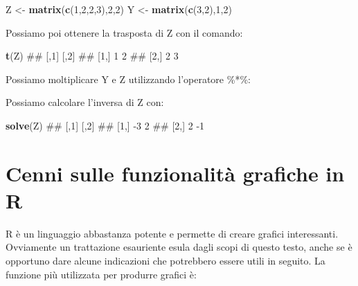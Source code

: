 \documentclass[a4paper,12pt,oneside]{book}
\newenvironment{Shaded}{\begin{snugshade}}{\end{snugshade}}
\newcommand{\KeywordTok}[1]{\textcolor[rgb]{0.13,0.29,0.53}{\textbf{#1}}}
\newcommand{\DecValTok}[1]{\textcolor[rgb]{0.00,0.00,0.81}{#1}}
\newcommand{\StringTok}[1]{\textcolor[rgb]{0.31,0.60,0.02}{#1}}
\newcommand{\OperatorTok}[1]{\textcolor[rgb]{0.81,0.36,0.00}{\textbf{#1}}}
\newcommand{\NormalTok}[1]{#1}
\theoremstyle{definition}
\theoremstyle{definition}
\theoremstyle{definition}
\theoremstyle{remark}
\begin{document}
\begin{Shaded}
\begin{Highlighting}[]
\NormalTok{Z  <-}\StringTok{  }\KeywordTok{matrix}\NormalTok{(}\KeywordTok{c}\NormalTok{(}\DecValTok{1}\NormalTok{,}\DecValTok{2}\NormalTok{,}\DecValTok{2}\NormalTok{,}\DecValTok{3}\NormalTok{),}\DecValTok{2}\NormalTok{,}\DecValTok{2}\NormalTok{)}
\NormalTok{Y  <-}\StringTok{  }\KeywordTok{matrix}\NormalTok{(}\KeywordTok{c}\NormalTok{(}\DecValTok{3}\NormalTok{,}\DecValTok{2}\NormalTok{),}\DecValTok{1}\NormalTok{,}\DecValTok{2}\NormalTok{)}
\end{Highlighting}
\end{Shaded}

Possiamo poi ottenere la trasposta di Z con il comando:

\begin{Shaded}
\begin{Highlighting}[]
\KeywordTok{t}\NormalTok{(Z)}
\NormalTok{##      [,1] [,2]}
\NormalTok{## [1,]    1    2}
\NormalTok{## [2,]    2    3}
\end{Highlighting}
\end{Shaded}

Possiamo moltiplicare Y e Z utilizzando l'operatore \%*\%:

\begin{Shaded}
\end{Shaded}

Possiamo calcolare l'inversa di Z con:

\begin{Shaded}
\begin{Highlighting}[]
\KeywordTok{solve}\NormalTok{(Z)}
\NormalTok{##      [,1] [,2]}
\NormalTok{## [1,]   -3    2}
\NormalTok{## [2,]    2   -1}
\end{Highlighting}
\end{Shaded}

\section*{Cenni sulle funzionalità grafiche in
R}\label{cenni-sulle-funzionalita-grafiche-in-r}

R è un linguaggio abbastanza potente e permette di creare grafici
interessanti. Ovviamente un trattazione esauriente esula dagli scopi di
questo testo, anche se è opportuno dare alcune indicazioni che
potrebbero essere utili in seguito. La funzione più utilizzata per
produrre grafici è:
\end{document}
